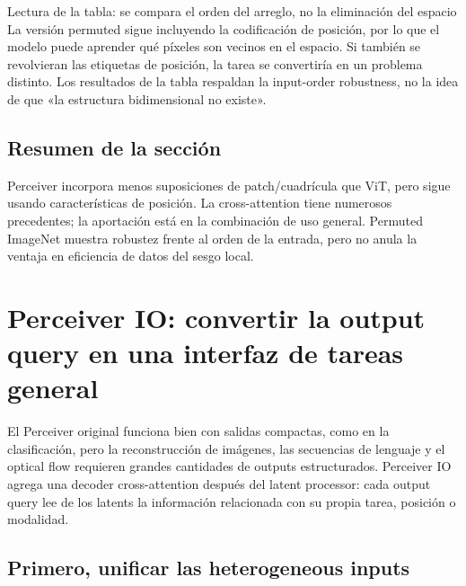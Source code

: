 \documentclass[a4paper]{article}
\begin{document}
\begin{knowledgebox}{Lectura de la tabla: se compara el orden del arreglo, no la eliminación del espacio}
La versión permuted sigue incluyendo la codificación de posición, por lo que el modelo puede aprender qué píxeles son vecinos en el espacio. Si también se revolvieran las etiquetas de posición, la tarea se convertiría en un problema distinto. Los resultados de la tabla respaldan la input-order robustness, no la idea de que «la estructura bidimensional no existe».
\end{knowledgebox}


\subsection{Resumen de la sección}

Perceiver incorpora menos suposiciones de patch/cuadrícula que ViT, pero sigue usando características de posición. La cross-attention tiene numerosos precedentes; la aportación está en la combinación de uso general. Permuted ImageNet muestra robustez frente al orden de la entrada, pero no anula la ventaja en eficiencia de datos del sesgo local.
\section{Perceiver IO: convertir la output query en una interfaz de tareas general}

El Perceiver original funciona bien con salidas compactas, como en la clasificación, pero la reconstrucción de imágenes, las secuencias de lenguaje y el optical flow requieren grandes cantidades de outputs estructurados. Perceiver IO agrega una decoder cross-attention después del latent processor: cada output query lee de los latents la información relacionada con su propia tarea, posición o modalidad.

\subsection{Primero, unificar las heterogeneous inputs}
\end{document}
